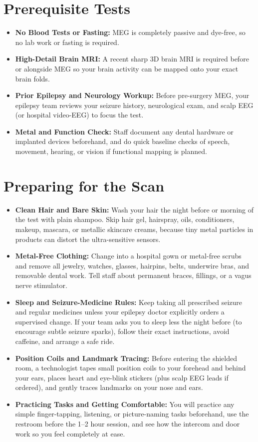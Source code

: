 \section{Prerequisite Tests}
\begin{itemize}
  \item \textbf{No Blood Tests or Fasting:} MEG is completely passive and dye-free, so no lab work or fasting is required.
  \item \textbf{High-Detail Brain MRI:} A recent sharp 3D brain MRI is required before or alongside MEG so your brain activity can be mapped onto your exact brain folds.
  \item \textbf{Prior Epilepsy and Neurology Workup:} Before pre-surgery MEG, your epilepsy team reviews your seizure history, neurological exam, and scalp EEG (or hospital video-EEG) to focus the test.
  \item \textbf{Metal and Function Check:} Staff document any dental hardware or implanted devices beforehand, and do quick baseline checks of speech, movement, hearing, or vision if functional mapping is planned.
\end{itemize}

\section{Preparing for the Scan}
\begin{itemize}
  \item \textbf{Clean Hair and Bare Skin:} Wash your hair the night before or morning of the test with plain shampoo. Skip hair gel, hairspray, oils, conditioners, makeup, mascara, or metallic skincare creams, because tiny metal particles in products can distort the ultra-sensitive sensors.
  \item \textbf{Metal-Free Clothing:} Change into a hospital gown or metal-free scrubs and remove all jewelry, watches, glasses, hairpins, belts, underwire bras, and removable dental work. Tell staff about permanent braces, fillings, or a vagus nerve stimulator.
  \item \textbf{Sleep and Seizure-Medicine Rules:} Keep taking all prescribed seizure and regular medicines unless your epilepsy doctor explicitly orders a supervised change. If your team asks you to sleep less the night before (to encourage subtle seizure sparks), follow their exact instructions, avoid caffeine, and arrange a safe ride.
  \item \textbf{Position Coils and Landmark Tracing:} Before entering the shielded room, a technologist tapes small position coils to your forehead and behind your ears, places heart and eye-blink stickers (plus scalp EEG leads if ordered), and gently traces landmarks on your nose and ears.
  \item \textbf{Practicing Tasks and Getting Comfortable:} You will practice any simple finger-tapping, listening, or picture-naming tasks beforehand, use the restroom before the 1--2 hour session, and see how the intercom and door work so you feel completely at ease.
\end{itemize}

